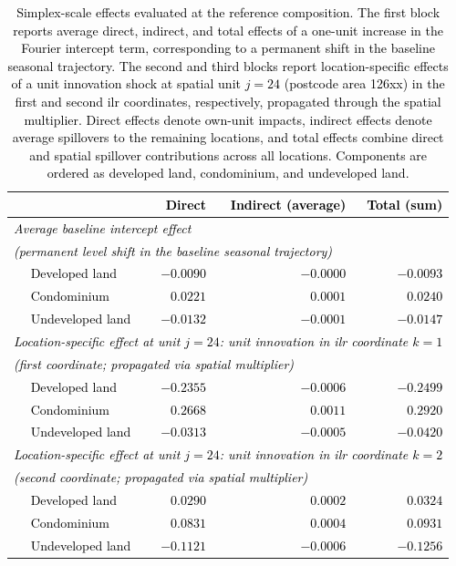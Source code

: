 \documentclass[12pt]{article}
\theoremstyle{plain}
\theoremstyle{definition}
\begin{document}
\begin{table}[t]
\centering
\textcolor{black}{
\begin{tabular}{l r r r}
\hline
 & Direct & Indirect (average) & Total (sum) \\
\hline
\multicolumn{4}{l}{\emph{Average baseline intercept effect}}\\
\multicolumn{4}{l}{\emph{(permanent level shift in the baseline seasonal trajectory)}}\\
$\quad$ Developed land   & $-0.0090$ & $-0.0000$ & $-0.0093$ \\
$\quad$ Condominium      & $ 0.0221$ & $ 0.0001$ & $ 0.0240$ \\
$\quad$ Undeveloped land & $-0.0132$ & $-0.0001$ & $-0.0147$ \\
\hline
\multicolumn{4}{l}{\emph{Location-specific effect at unit $j=24$: unit innovation in ilr coordinate $k=1$}}\\
\multicolumn{4}{l}{\emph{(first coordinate; propagated via spatial multiplier)}}\\
$\quad$ Developed land   & $-0.2355$ & $-0.0006$ & $-0.2499$ \\
$\quad$ Condominium      & $ 0.2668$ & $ 0.0011$ & $ 0.2920$ \\
$\quad$ Undeveloped land & $-0.0313$ & $-0.0005$ & $-0.0420$ \\
\hline
\multicolumn{4}{l}{\emph{Location-specific effect at unit $j=24$: unit innovation in ilr coordinate $k=2$}}\\
\multicolumn{4}{l}{\emph{(second coordinate; propagated via spatial multiplier)}}\\
$\quad$ Developed land   & $ 0.0290$ & $ 0.0002$ & $ 0.0324$ \\
$\quad$ Condominium      & $ 0.0831$ & $ 0.0004$ & $ 0.0931$ \\
$\quad$ Undeveloped land & $-0.1121$ & $-0.0006$ & $-0.1256$ \\
\hline
\end{tabular}
}
\caption{Simplex-scale effects evaluated at the reference composition. The first block reports average direct, indirect, and total effects of a one-unit increase in the Fourier intercept term, corresponding to a permanent shift in the baseline seasonal trajectory. The second and third blocks report location-specific effects of a unit innovation shock at spatial unit $j=24$ (postcode area 126xx) in the first and second ilr coordinates, respectively, propagated through the spatial multiplier. Direct effects denote own-unit impacts, indirect effects denote average spillovers to the remaining locations, and total effects combine direct and spatial spillover contributions across all locations. Components are ordered as developed land, condominium, and undeveloped land.}
\label{tab:baseline_spatial_effects}
\end{table}
\end{document}
